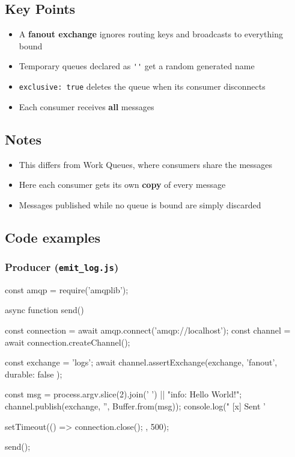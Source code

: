 \documentclass[11pt,a4paper]{article}
\begin{document}
\subsection*{Key Points}

\begin{itemize}\itemsep2pt
  \item A \textbf{fanout exchange} ignores routing keys and broadcasts to everything bound
  \item Temporary queues declared as \lstinline|''| get a random generated name
  \item \lstinline|exclusive: true| deletes the queue when its consumer disconnects
  \item Each consumer receives \textbf{all} messages
\end{itemize}

\subsection*{Notes}

\begin{itemize}\itemsep2pt
  \item This differs from Work Queues, where consumers share the messages
  \item Here each consumer gets its own \textbf{copy} of every message
  \item Messages published while no queue is bound are simply discarded
\end{itemize}

\newpage
\subsection{Code examples}

\subsubsection*{Producer (\texttt{emit\_log.js})}
\begin{js}
const amqp = require('amqplib');

async function send() {
    const connection = await amqp.connect('amqp://localhost');
    const channel = await connection.createChannel();

    const exchange = 'logs';
    await channel.assertExchange(exchange, 'fanout', { durable: false });

    const msg = process.argv.slice(2).join(' ') || "info: Hello World!";
    channel.publish(exchange, '', Buffer.from(msg));
    console.log(" [x] Sent '%

    setTimeout(() => { connection.close(); }, 500);
}
send();
\end{js}
\end{document}
